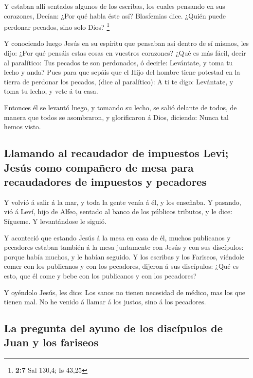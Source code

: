  Y estaban allí sentados algunos de los escribas, los cuales
pensando en sus corazones,  Decían: ¿Por qué habla éste así?
Blasfemias dice. ¿Quién puede perdonar pecados, sino solo Dios?
\footnote{\textbf{2:7} Sal 130,4; Is 43,25}

 Y conociendo luego Jesús en su espíritu que pensaban así
dentro de sí mismos, les dijo: ¿Por qué pensáis estas cosas en vuestros
corazones?  ¿Qué es más fácil, decir al paralítico: Tus
pecados te son perdonados, ó decirle: Levántate, y toma tu lecho y anda?
 Pues para que sepáis que el Hijo del hombre tiene potestad
en la tierra de perdonar los pecados, (dice al paralítico):
 A ti te digo: Levántate, y toma tu lecho, y vete á tu
casa.

 Entonces él se levantó luego, y tomando su lecho, se salió
delante de todos, de manera que todos se asombraron, y glorificaron á
Dios, diciendo: Nunca tal hemos visto.

\hypertarget{llamando-al-recaudador-de-impuestos-levi-jesuxfas-como-compauxf1ero-de-mesa-para-recaudadores-de-impuestos-y-pecadores}{%
\subsection{Llamando al recaudador de impuestos Levi; Jesús como
compañero de mesa para recaudadores de impuestos y
pecadores}\label{llamando-al-recaudador-de-impuestos-levi-jesuxfas-como-compauxf1ero-de-mesa-para-recaudadores-de-impuestos-y-pecadores}}

 Y volvió á salir á la mar, y toda la gente venía á él, y
los enseñaba.  Y pasando, vió á Leví, hijo de Alfeo,
sentado al banco de los públicos tributos, y le dice: Sígueme. Y
levantándose le siguió.

 Y aconteció que estando Jesús á la mesa en casa de él,
muchos publicanos y pecadores estaban también á la mesa juntamente con
Jesús y con sus discípulos: porque había muchos, y le habían seguido.
 Y los escribas y los Fariseos, viéndole comer con los
publicanos y con los pecadores, dijeron á sus discípulos: ¿Qué es esto,
que él come y bebe con los publicanos y con los pecadores?

 Y oyéndolo Jesús, les dice: Los sanos no tienen necesidad
de médico, mas los que tienen mal. No he venido á llamar á los justos,
sino á los pecadores.

\hypertarget{la-pregunta-del-ayuno-de-los-discuxedpulos-de-juan-y-los-fariseos}{%
\subsection{La pregunta del ayuno de los discípulos de Juan y los
fariseos}\label{la-pregunta-del-ayuno-de-los-discuxedpulos-de-juan-y-los-fariseos}}

